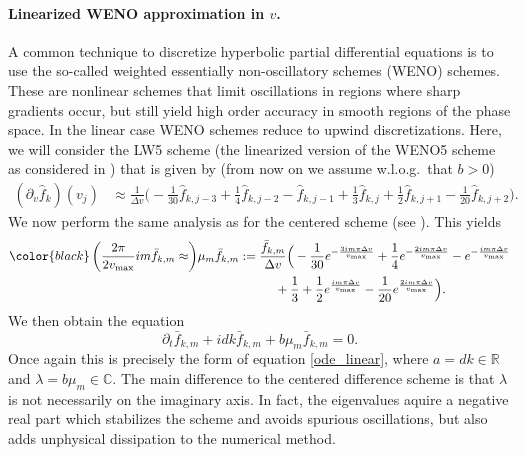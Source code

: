 \paragraph{Linearized WENO approximation in $v$.\\} 

A common technique to discretize hyperbolic partial differential equations is to use the so-called weighted essentially non-oscillatory schemes (WENO) schemes. These are nonlinear schemes that limit oscillations in regions where sharp gradients occur, but still yield high order accuracy in smooth regions of the phase space. In the linear case WENO schemes reduce to upwind discretizations. Here, we will consider the LW5 scheme (the linearized version of the WENO5 scheme as considered in \cite{Baldauf:2008, Lunet:2017, Motamed:2010, Wang:2007}) that is given by (from now on we assume w.l.o.g.~that $b>0$)
\begin{align*}
(\partial_v \hat{f}_k)(v_j) &\approx \frac{1}{\Delta v}\Big(-\frac{1}{30} \hat{f}_{k,j-3} +\frac{1}{4} \hat{f}_{k,j-2} -\hat{f}_{k,j-1} + \frac{1}{3} \hat{f}_{k,j} +\frac{1}{2} \hat{f}_{k,j+1} - \frac{1}{20} \hat{f}_{k,j+2}\Big). 
\end{align*}
We now perform the same analysis as for the centered scheme (see \cite{Baldauf:2008, Crouseilles:2012}). This yields
\begin{align}
  {\color{black} \left( \frac{2\pi }{2 v_{\max}}  i m \bar{f}_{k, m} \approx \right)}
   \mu_m \bar{f}_{k, m} &:= \frac{\bar{f}_{k,m}}{\Delta v}\Big(-\frac{1}{30} e^{-\frac{3i m\pi \Delta v}{v_{\max}}} +\frac{1}{4} e^{-\frac{2i m \pi \Delta v}{v_{\max}}} -e^{-\frac{i m \pi \Delta v}{v_{\max}}}  \nonumber\\
&\hspace{1cm}+ \frac{1}{3}  +\frac{1}{2} e^{\frac{i m \pi \Delta v}{v_{\max}}} - \frac{1}{20} e^{\frac{2i m \pi \Delta v}{v_{\max}}}\Big). 
\label{lw5symbol}
\end{align}
We then obtain the equation 
\begin{equation}
	\label{discrete_linear_transport_weno}
	\partial_t \bar{f}_{k,m} + i dk\bar{f}_{k,m} +b \mu_m \bar{f}_{k,m}= 0.
\end{equation}
Once again this is precisely the form of equation \eqref{ode_linear}, where $a=dk\in\mathbb{R}$ and $\lambda=b\mu_m \in\mathbb{C}$. The main difference to the centered difference scheme is that $\lambda$ is not necessarily on the imaginary axis. In fact, the eigenvalues aquire a negative real part which stabilizes the scheme and avoids spurious oscillations, but also adds unphysical dissipation to the numerical method.

